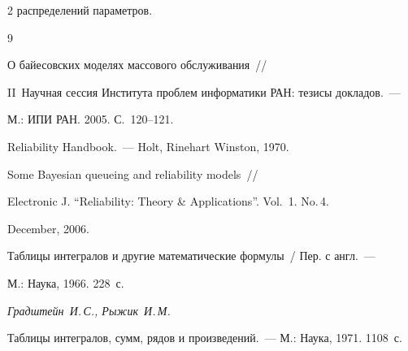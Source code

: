 \begin{multicols}{2}
распределений параметров.





{\small\frenchspacing


{%




\begin{thebibliography}{9}






О байесовских моделях массового обслуживания~// 


II~Научная сессия Института проблем информатики РАН: тезисы докладов.~---  


М.: ИПИ РАН. 2005. С.~120--121.









Reliability Handbook.~---  Holt, Rinehart  Winston, 1970.









Some Bayesian queueing and reliability models~// 


Electronic J. ``Reliability: Theory \& Applications''. Vol.\ 1. No.\,4. 


December, 2006.









Таблицы интегралов и другие математические формулы~/ Пер. с англ.~---  


М.: Наука, 1966. 228~с.







\textit{Градштейн~И.\,С., Рыжик~И.\,М.}


Таблицы интегралов, сумм, рядов и произведений.~---  М.: Наука, 1971.  1108~с.








\end{thebibliography}





}


}





\end{multicols}








\label{end\stat}


